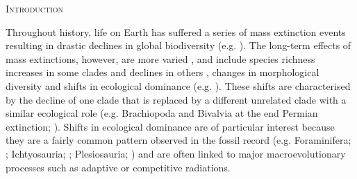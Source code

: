 \documentclass[12pt,letterpaper]{article}
\renewcommand{\section}[1]{%
\bigskip
\begin{center}
\begin{Large}
\normalfont\scshape #1
\medskip
\end{Large}
\end{center}}
\begin{document}

\vspace{1.5in}

\newpage 

%
%

\section{Introduction}
Throughout history, life on Earth has suffered a series of mass extinction events resulting in drastic declines in global biodiversity (e.g. \cite{RaupPT,BentonPT,rennetime2013,Brusatte2015}).
The long-term effects of mass extinctions, however, are more varied \cite{Erwin1998344}, and include species richness increases in some clades \cite{friedmanexplosive2010} and declines in others \cite{Brusatte2015}
, changes in morphological diversity \cite{kornextinction2013} and shifts in ecological dominance (e.g. \cite{Brusatte12092008,toljagictriassic-jurassic2013,bensonfaunal2014}).
These shifts are characterised by the decline of one clade that is replaced by a different unrelated clade with a similar ecological role (e.g. Brachiopoda and Bivalvia at the end Permian extinction; \cite{Liow2015}).
Shifts in ecological dominance are of particular interest because they are a fairly common pattern observed in the fossil record (e.g. Foraminifera; \cite{Coxall01042006}; Ichtyosauria; \cite{thorneresetting2011}; Plesiosauria; \cite{bensonfaunal2014}) and are often linked to major macroevolutionary processes such as adaptive \cite{Losos2010} or competitive \cite{Brusatte12092008} radiations.
\end{document}

